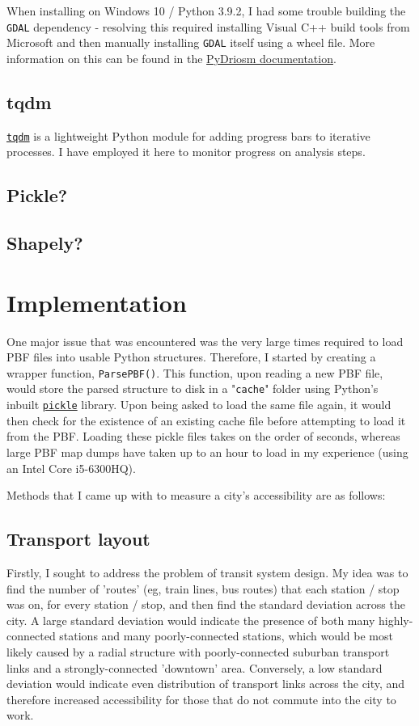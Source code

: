 \documentclass[11pt]{article} %
\begin{document}
When installing on Windows 10 / Python 3.9.2, I had some trouble building the \texttt{GDAL} dependency - resolving this required installing Visual C++ build tools from Microsoft and then manually installing \texttt{GDAL} itself using a wheel file. More information on this can be found in the \href{https://pydriosm.readthedocs.io/en/latest/installation.html}{PyDriosm documentation}.

\subsection{tqdm}
\href{https://tqdm.github.io/}{\texttt{tqdm}} is a lightweight Python module for adding progress bars to iterative processes. I have employed it here to monitor progress on analysis steps.

\subsection{Pickle?}

\subsection{Shapely?}


\section{Implementation}
One major issue that was encountered was the very large times required to load PBF files into usable Python structures. Therefore, I started by creating a wrapper function, \texttt{ParsePBF()}. This function, upon reading a new PBF file, would store the parsed structure to disk in a "\texttt{cache}" folder using Python's inbuilt \href{https://docs.python.org/3/library/pickle.html}{\texttt{pickle}} library. Upon being asked to load the same file again, it would then check for the existence of an existing cache file before attempting to load it from the PBF. Loading these pickle files takes on the order of seconds, whereas large PBF map dumps have taken up to an hour to load in my experience (using an Intel Core i5-6300HQ).

Methods that I came up with to measure a city's accessibility are as follows:

\subsection{Transport layout}
Firstly, I sought to address the problem of transit system design. My idea was to find the number of 'routes' (eg, train lines, bus routes) that each station / stop was on, for every station / stop, and then find the standard deviation across the city. A large standard deviation would indicate the presence of both many highly-connected stations and many poorly-connected stations, which would be most likely caused by a radial structure with poorly-connected suburban transport links and a strongly-connected 'downtown' area. Conversely, a low standard deviation would indicate even distribution of transport links across the city, and therefore increased accessibility for those that do not commute into the city to work.
\end{document}
